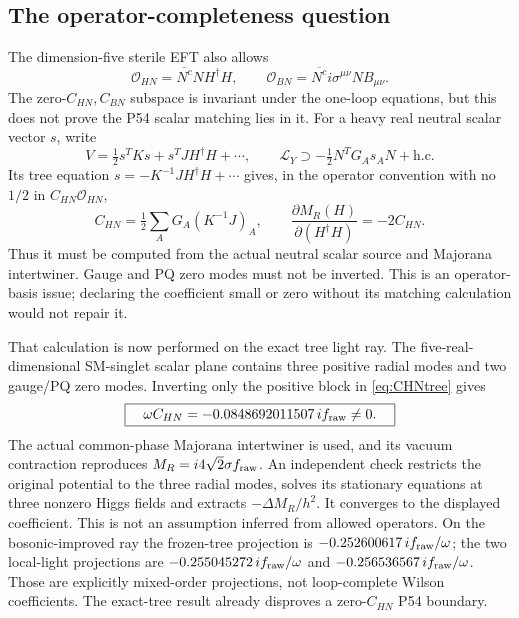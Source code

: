 \documentclass[11pt]{article}
\begin{document}
\subsection{The operator-completeness question}
The dimension-five sterile EFT also allows
\begin{equation}
 \mathcal O_{HN}=\overline{N^c}N H^\dagger H,\qquad
 \mathcal O_{BN}=\overline{N^c}i\sigma^{\mu\nu}N B_{\mu\nu}.
\end{equation}
The zero-$C_{HN},C_{BN}$ subspace is invariant under the one-loop
equations, but this does not prove the P54 scalar matching lies in it.
For a heavy real neutral scalar vector $s$, write
\begin{equation}
 V=\tfrac12s^TKs+s^TJH^\dagger H+\cdots,\qquad
 \mathcal L_Y\supset-\tfrac12N^TG_As_AN+\mathrm{h.c.}
\end{equation}
Its tree equation $s=-K^{-1}JH^\dagger H+\cdots$ gives, in the
operator convention with no $1/2$ in $C_{HN}\mathcal O_{HN}$,
\begin{equation}
 C_{HN}=\tfrac12\sum_A G_A(K^{-1}J)_A,\qquad
 \frac{\partial M_R(H)}{\partial(H^\dagger H)}=-2C_{HN}.
 \label{eq:CHNtree}
\end{equation}
Thus it must be computed from the actual neutral scalar source and
Majorana intertwiner. Gauge and PQ zero modes must not be inverted.
This is an operator-basis issue; declaring the coefficient small or
zero without its matching calculation would not repair it.

That calculation is now performed on the exact tree light ray. The
five-real-dimensional SM-singlet scalar plane contains three positive
radial modes and two gauge/PQ zero modes. Inverting only the positive
block in \eqref{eq:CHNtree} gives
\begin{equation}
 \boxed{\quad \omega C_{HN}=-0.0848692011507\,i f_{\rm raw}\ne0.\quad}
\end{equation}
The actual common-phase Majorana intertwiner is used, and its vacuum
contraction reproduces $M_R=i4\sqrt2\sigma f_{\rm raw}$.
An independent check restricts the original potential to the three
radial modes, solves its stationary equations at three nonzero Higgs
fields and extracts $-\Delta M_R/h^2$. It converges to the displayed
coefficient. This is not an assumption inferred from allowed operators.
On the bosonic-improved ray the frozen-tree projection is
$-0.252600617\,i f_{\rm raw}/\omega$; the two local-light projections
are $-0.255045272\,i f_{\rm raw}/\omega$ and
$-0.256536567\,i f_{\rm raw}/\omega$. Those are explicitly mixed-order
projections, not loop-complete Wilson coefficients. The exact-tree
result already disproves a zero-$C_{HN}$ P54 boundary.
\end{document}
